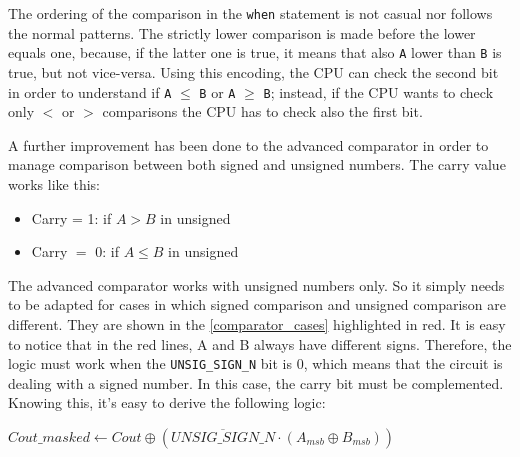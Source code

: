  The ordering of the comparison in the \texttt{when} statement is not casual nor follows the normal patterns. The strictly lower comparison is made before the lower equals one, because, if the latter one is true, it means that also \texttt{A} lower than \texttt{B} is true, but not vice-versa. Using this encoding, the CPU can check the second bit in order to understand if \texttt{A} $\leq$ \texttt{B} or \texttt{A} $\geq$ \texttt{B}; instead, if the CPU wants to check only $<$ or $>$ comparisons the CPU has to check also the first bit.

 

A further improvement has been done to the advanced comparator in order to manage comparison between both signed and unsigned numbers. The carry value works like this:
\begin{itemize}
  \item Carry = 1: if \(A > B\) in unsigned
  \item Carry \(=\) 0: if \(A \leq B\) in unsigned
\end{itemize}

The advanced comparator works with unsigned numbers only. So it simply needs to be adapted for cases in which signed comparison and unsigned comparison are different. They are shown in the \autoref{comparator_cases} highlighted in red. 
It is easy to notice that in the red lines, A and B always have different signs. Therefore, the logic must work when the \texttt{UNSIG\_SIGN\_N} bit is 0, which means that the circuit is dealing with a signed number. In this case, the carry bit must be complemented. Knowing this, it's easy to derive the following logic:

\begin{center}
	$Cout\_masked \leftarrow Cout \oplus (\overline{UNSIG\_SIGN\_N} \cdot (A_{msb} \oplus B_{msb}))$
\end{center}

